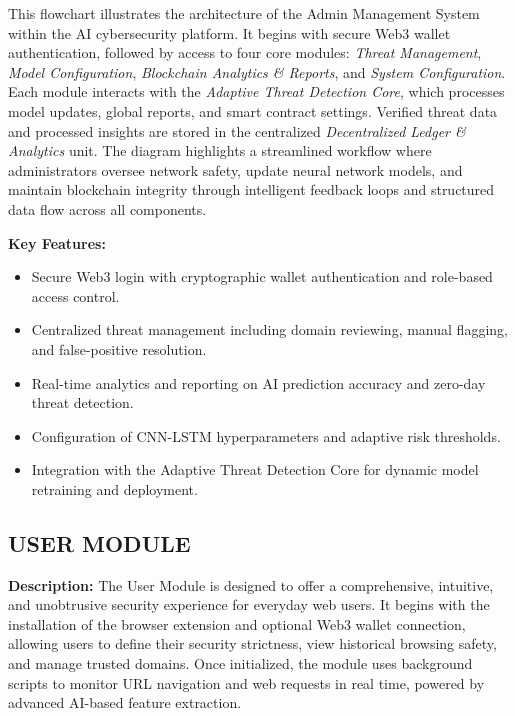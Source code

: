 This flowchart illustrates the architecture of the Admin Management System within the AI cybersecurity platform. It begins with secure Web3 wallet authentication, followed by access to four core modules: \textit{Threat Management}, \textit{Model Configuration}, \textit{Blockchain Analytics \& Reports}, and \textit{System Configuration}. Each module interacts with the \textit{Adaptive Threat Detection Core}, which processes model updates, global reports, and smart contract settings. Verified threat data and processed insights are stored in the centralized \textit{Decentralized Ledger \& Analytics} unit. The diagram highlights a streamlined workflow where administrators oversee network safety, update neural network models, and maintain blockchain integrity through intelligent feedback loops and structured data flow across all components.

\vspace{0.5cm}

\textbf{Key Features:}
\begin{itemize}
    \item Secure Web3 login with cryptographic wallet authentication and role-based access control.
    \item Centralized threat management including domain reviewing, manual flagging, and false-positive resolution.
    \item Real-time analytics and reporting on AI prediction accuracy and zero-day threat detection.
    \item Configuration of CNN-LSTM hyperparameters and adaptive risk thresholds.
    \item Integration with the Adaptive Threat Detection Core for dynamic model retraining and deployment.
\end{itemize}
\subsection{USER MODULE}

\hspace{1cm}\textbf{Description:}  
The User Module is designed to offer a comprehensive, intuitive, and unobtrusive security experience for everyday web users. It begins with the installation of the browser extension and optional Web3 wallet connection, allowing users to define their security strictness, view historical browsing safety, and manage trusted domains. Once initialized, the module uses background scripts to monitor URL navigation and web requests in real time, powered by advanced AI-based feature extraction.  

